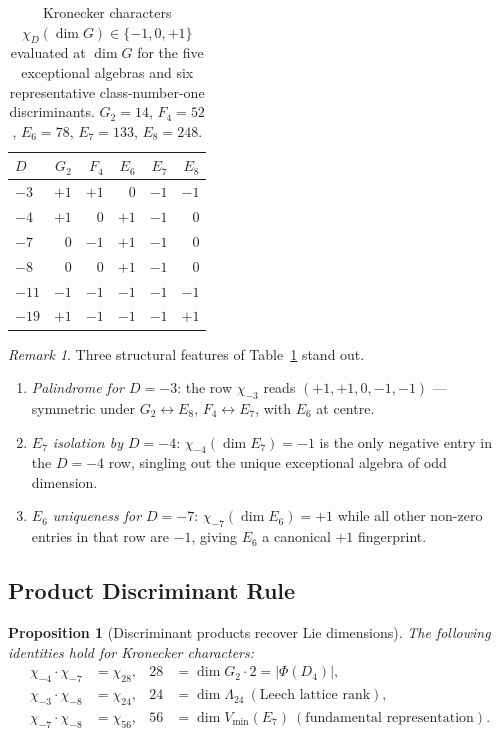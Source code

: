 \documentclass[11pt]{amsart}
\theoremstyle{plain}
\newtheorem{proposition}[theorem]{Proposition}
\theoremstyle{definition}
\theoremstyle{remark}
\newtheorem{remark}[theorem]{Remark}
\renewcommand{\Phi}{\varPhi}
\begin{document}
\begin{table}[htbp]
\centering
\caption{Kronecker characters $\chi_D(\dim G) \in \{-1,0,+1\}$ evaluated at
  $\dim G$ for the five exceptional algebras and six representative
  class-number-one discriminants.
  $G_2=14$, $F_4=52$, $E_6=78$, $E_7=133$, $E_8=248$.}
\label{tab:kronecker}
\small
\begin{tabular}{lrrrrr}
\toprule
$D$ & $G_2$ & $F_4$ & $E_6$ & $E_7$ & $E_8$ \\
\midrule
$-3$  & $+1$ & $+1$ & $0$  & $-1$ & $-1$ \\
$-4$  & $+1$ & $0$  & $+1$ & $-1$ & $0$  \\
$-7$  & $0$  & $-1$ & $+1$ & $-1$ & $0$  \\
$-8$  & $0$  & $0$  & $+1$ & $-1$ & $0$  \\
$-11$ & $-1$ & $-1$ & $-1$ & $-1$ & $-1$ \\
$-19$ & $+1$ & $-1$ & $-1$ & $-1$ & $+1$ \\
\bottomrule
\end{tabular}
\end{table}

\begin{remark}
Three structural features of Table~\ref{tab:kronecker} stand out.
\begin{enumerate}
\item \emph{Palindrome for $D=-3$}: the row $\chi_{-3}$ reads
  $(+1,+1,0,-1,-1)$ --- symmetric under $G_2 \leftrightarrow E_8$,
  $F_4 \leftrightarrow E_7$, with $E_6$ at centre.
\item \emph{$E_7$ isolation by $D=-4$}: $\chi_{-4}(\dim E_7)=-1$ is the
  only negative entry in the $D=-4$ row, singling out the unique
  exceptional algebra of odd dimension.
\item \emph{$E_6$ uniqueness for $D=-7$}: $\chi_{-7}(\dim E_6)=+1$ while
  all other non-zero entries in that row are $-1$, giving $E_6$ a
  canonical $+1$ fingerprint.
\end{enumerate}
\end{remark}

\subsection{Product Discriminant Rule}\label{subsec:product-disc}

\begin{proposition}[Discriminant products recover Lie dimensions]
\label{prop:product-disc}
The following identities hold for Kronecker characters:
\begin{align}
\chi_{-4} \cdot \chi_{-7} &= \chi_{28}, &
  28 &= \dim G_2 \cdot 2 = |\Phi(D_4)|, \label{eq:chi-d4}\\
\chi_{-3} \cdot \chi_{-8} &= \chi_{24}, &
  24 &= \dim \Lambda_{24}\ (\text{Leech lattice rank}), \label{eq:chi-leech}\\
\chi_{-7} \cdot \chi_{-8} &= \chi_{56}, &
  56 &= \dim V_{\text{min}}(E_7)\ (\text{fundamental representation}).
  \label{eq:chi-e7}
\end{align}
\end{proposition}
\end{document}
